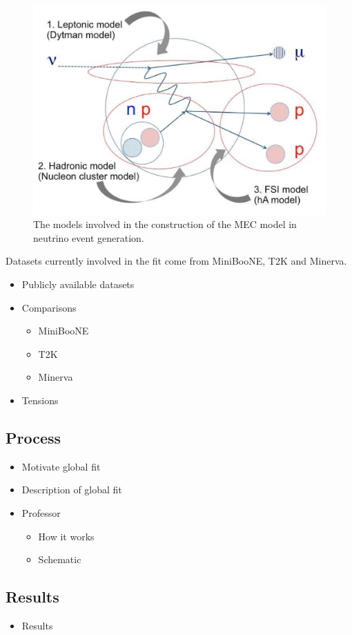 \begin{figure}[h!]
    \centering
    \includegraphics[width=.6\textwidth]{images/mec_model_genie.png}
    \caption{The models involved in the construction of the MEC model in neutrino event generation.}
    \label{fig:MECSchem}
\end{figure}

Datasets currently involved in the fit come from MiniBooNE, T2K and Minerva. 


\begin{itemize}
    \item Publicly available datasets
    \item Comparisons
    \begin{itemize}
        \item MiniBooNE
        \item T2K
        \item Minerva
    \end{itemize}
    \item Tensions
\end{itemize}

\subsection{Process}
\begin{itemize}
    \item Motivate global fit
    \item Description of global fit
    \item Professor
    \begin{itemize}
        \item How it works
        \item Schematic
    \end{itemize}
\end{itemize}

\subsection{Results}
\begin{itemize}
    \item Results 
\end{itemize}



\clearpage

